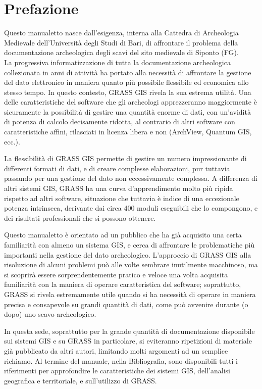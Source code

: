 \chapter*{Prefazione}

	Questo manualetto nasce dall'esigenza, interna alla Cattedra di Archeologia Medievale dell'Università degli Studi di Bari, di affrontare il problema della documentazione archeologica degli scavi del sito medievale di Siponto (FG).\\

	La progressiva informatizzazione di tutta la documentazione archeologica collezionata in anni di attività ha portato alla necessità di affrontare la gestione del dato elettronico in maniera quanto più possibile flessibile ed economica allo stesso tempo. In questo contesto, GRASS GIS rivela la sua estrema utilità. Una delle caratteristiche del software che gli archeologi apprezzeranno maggiormente è sicuramente la possibilità di gestire una quantità enorme di dati, con un'avidità di potenza di calcolo decisamente ridotta, al contrario di altri software con caratteristiche affini, rilasciati in licenza libera e non (ArchView, Quantum GIS, ecc.).

	La flessibilità di GRASS GIS permette di gestire un numero impressionante di differenti formati di dati, e di creare complesse elaborazioni, pur tuttavia passando per una gestione del dato non eccessivamente complessa. A differenza di altri sistemi GIS, GRASS ha una curva d'apprendimento molto più ripida rispetto ad altri software, situazione che tuttavia è indice di una eccezionale potenza intrinseca, derivante dai circa 400 moduli eseguibili che lo compongono, e dei risultati professionali che si possono ottenere.

	Questo manualetto è orientato ad un pubblico che ha già acquisito una certa familiarità con almeno un sistema GIS, e cerca di affrontare le problematiche più importanti nella gestione del dato archeologico.  L'approccio di GRASS GIS alla risoluzione di alcuni problemi può alle volte sembrare inutilmente macchinoso, ma si scoprirà essere sorprendentemente pratico e veloce una volta acquisita familiarità con la maniera di operare caratteristica del software; soprattutto, GRASS si rivela estremamente utile quando si ha necessità di operare in maniera precisa e consapevole su grandi quantità di dati, come può avvenire durante (o dopo) uno scavo archeologico.

	In questa sede, soprattutto per la grande quantità di documentazione disponibile sui sistemi GIS e su GRASS in particolare, si eviteranno ripetizioni di materiale già pubblicato da altri autori, limitando molti argomenti ad un semplice richiamo. Al termine del manuale, nella Bibliografia, sono disponibili tutti i riferimenti per approfondire le caratteristiche dei sistemi GIS, dell'analisi geografica e territoriale, e sull'utilizzo di GRASS.

